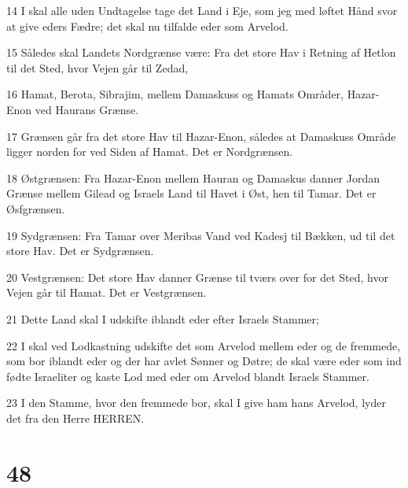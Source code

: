 \par 14 I skal alle uden Undtagelse tage det Land i Eje, som jeg med løftet Hånd svor at give eders Fædre; det skal nu tilfalde eder som Arvelod.
\par 15 Således skal Landets Nordgrænse være: Fra det store Hav i Retning af Hetlon til det Sted, hvor Vejen går til Zedad,
\par 16 Hamat, Berota, Sibrajim, mellem Damaskuss og Hamats Områder, Hazar-Enon ved Haurans Grænse.
\par 17 Grænsen går fra det store Hav til Hazar-Enon, således at Damaskuss Område ligger norden for ved Siden af Hamat. Det er Nordgrænsen.
\par 18 Østgrænsen: Fra Hazar-Enon mellem Hauran og Damaskus danner Jordan Grænse mellem Gilead og Israels Land til Havet i Øst, hen til Tamar. Det er Øsfgrænsen.
\par 19 Sydgrænsen: Fra Tamar over Meribas Vand ved Kadesj til Bækken, ud til det store Hav. Det er Sydgrænsen.
\par 20 Vestgrænsen: Det store Hav danner Grænse til tværs over for det Sted, hvor Vejen går til Hamat. Det er Vestgrænsen.
\par 21 Dette Land skal I udskifte iblandt eder efter Israels Stammer;
\par 22 I skal ved Lodkastning udskifte det som Arvelod mellem eder og de fremmede, som bor iblandt eder og der har avlet Sønner og Døtre; de skal være eder som ind fødte Israeliter og kaste Lod med eder om Arvelod blandt Israels Stammer.
\par 23 I den Stamme, hvor den fremmede bor, skal I give ham hans Arvelod, lyder det fra den Herre HERREN.

\chapter{48}

